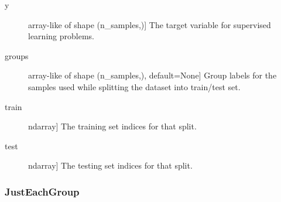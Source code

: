 \documentclass[letterpaper,10pt,english]{sphinxmanual}
\begin{document}
\begin{fulllineitems}
\begin{fulllineitems}
\begin{description}
\item[{y}] \leavevmode{[}array-like of shape (n\_samples,){]}
The target variable for supervised learning problems.

\item[{groups}] \leavevmode{[}array-like of shape (n\_samples,), default=None{]}
Group labels for the samples used while splitting the dataset into
train/test set.

\end{description}
\begin{description}
\item[{train}] \leavevmode{[}ndarray{]}
The training set indices for that split.

\item[{test}] \leavevmode{[}ndarray{]}
The testing set indices for that split.

\end{description}

\end{fulllineitems}


\end{fulllineitems}



\subsubsection{JustEachGroup}
\label{\detokenize{api/mastml.data_splitters.JustEachGroup:justeachgroup}}\label{\detokenize{api/mastml.data_splitters.JustEachGroup::doc}}
\end{document}
